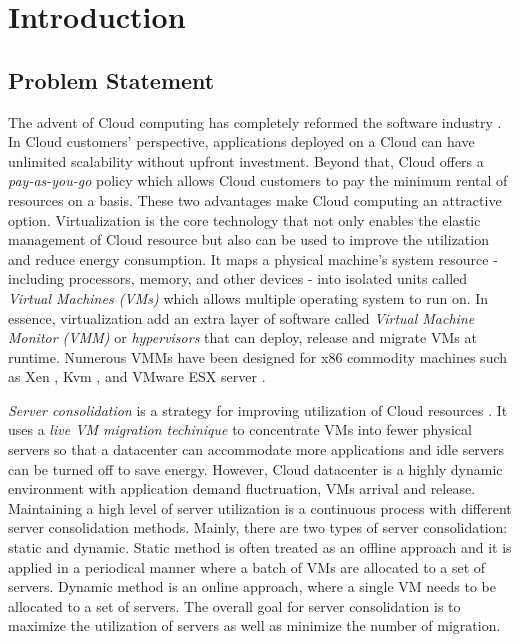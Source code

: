 \chapter{Introduction}\label{C:intro}
\section{Problem Statement}

The advent of Cloud computing has completely reformed the software industry \cite{Buyya:2009wt}. 
In Cloud customers' perspective, applications deployed on a Cloud can 
have unlimited scalability without upfront investment. Beyond that, 
Cloud offers a \emph{pay-as-you-go} policy which allows Cloud customers to 
pay the minimum rental of resources on a basis.
These two advantages make Cloud computing an attractive option.
Virtualization \cite{Uhlig:2005ub} is the core technology that not only enables 
the elastic management of Cloud resource but also can be used to improve the utilization and reduce 
energy consumption.
It maps a physical machine's system resource - including processors, memory, and 
other devices - into isolated units called \emph{Virtual Machines (VMs)} which allows 
multiple operating system to run on. 
In essence, virtualization add an extra layer of software called 
\emph{Virtual Machine Monitor (VMM)} or \emph{hypervisors} that can deploy, 
release and migrate VMs at runtime. 
Numerous VMMs have been designed for x86 commodity machines such as 
Xen \cite{Barham:2003vu}, Kvm \cite{Kivity:2007wu}, and VMware ESX server \cite{Barham:2003vu}.
 
\emph{Server consolidation} is a strategy for improving utilization of Cloud resources
 \cite{Zhang:2010vo}.
It uses a \emph{live VM migration techinique} \cite{Clark:2005ud} to concentrate VMs into fewer 
physical servers so that a datacenter can accommodate more applications and idle servers 
can be turned off to save energy. 
However, Cloud datacenter is a highly dynamic environment with application demand fluctruation, 
VMs arrival and release.
Maintaining a high level of server utilization is a continuous process with different server consolidation
methods. Mainly, there are two types of server consolidation: static and dynamic. 
Static method is often treated as an offline approach and it is applied in a periodical manner 
where a batch of VMs are allocated to a set of servers. 
Dynamic method is an online approach, 
where a single VM needs to be allocated to a set of servers. 
The overall goal for server consolidation is to maximize the utilization of servers as well as 
minimize the number of migration. 

